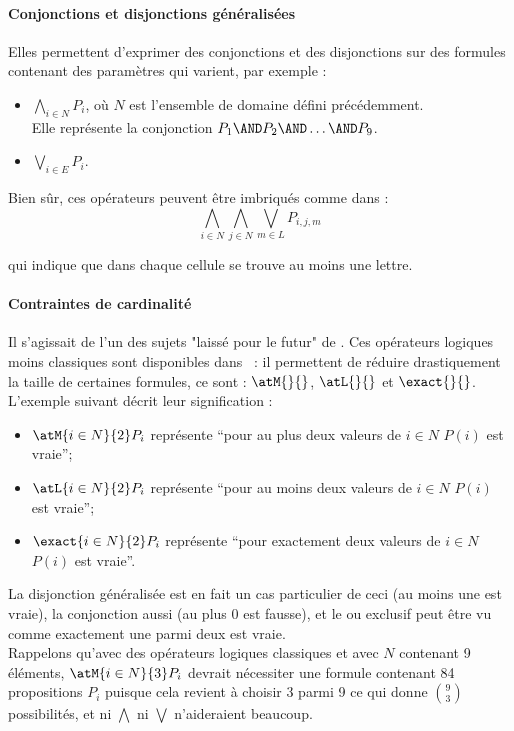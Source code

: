 \paragraph{Conjonctions et disjonctions généralisées}
Elles permettent d'exprimer des conjonctions et des disjonctions sur des formules contenant des paramètres qui varient, par exemple :
\begin{itemize}
\item $ \bigwedge_{i \in N} P_i$, où $N$ est l'ensemble de domaine défini précédemment.\\
  Elle représente la conjonction
  $P_1 \AND P_2 \AND \ldots \AND P_9$. 
\item $\bigvee_{i \in E} P_i$.
\end{itemize}

Bien s\^ur, ces opérateurs peuvent être imbriqués comme dans :
$$\bigwedge_{i \in N} \bigwedge_{j \in N}\bigvee_{ m\in L}P_{i,j,m}$$

qui indique que dans chaque cellule se trouve au moins une lettre.


\paragraph{Contraintes de cardinalité}
Il s'agissait de l'un des sujets "laissé pour le futur" de \cite{GaScSt2011}.
Ces opérateurs logiques moins classiques sont disponibles dans \touist\ : il permettent de réduire drastiquement la taille de certaines formules, ce sont : $\atM{}{}$, $\atL{}{}$ et $\exact{}{}$.\\ L'exemple suivant décrit leur signification :
\begin{itemize}
\item $\atM{i \in N}{2} P_i$ représente ``pour au plus deux valeurs de $i \in N$ $P(i)$ est vraie'';
\item $\atL{i \in N}{2} P_i$ représente ``pour au moins deux valeurs de $i \in N$ $P(i)$ est vraie'';
\item $\exact{i \in N}{2} P_i$ représente ``pour exactement deux valeurs de $i \in N$ $P(i)$ est vraie''.
\end{itemize}
La disjonction généralisée est en fait un cas particulier de ceci (au moins une est vraie), la conjonction aussi (au plus 0 est fausse), et le ou exclusif peut être vu comme exactement une parmi deux est vraie. \\
Rappelons qu'avec des opérateurs logiques classiques et avec $N$ contenant 9 éléments, $\atM{i \in N}{3} P_i$ devrait nécessiter une formule contenant 84 propositions $P_i$ puisque cela revient à choisir 3 parmi 9 ce qui donne $\binom{9}{3}$ possibilités, et ni $\bigwedge$ ni $\bigvee$ n'aideraient beaucoup. 

